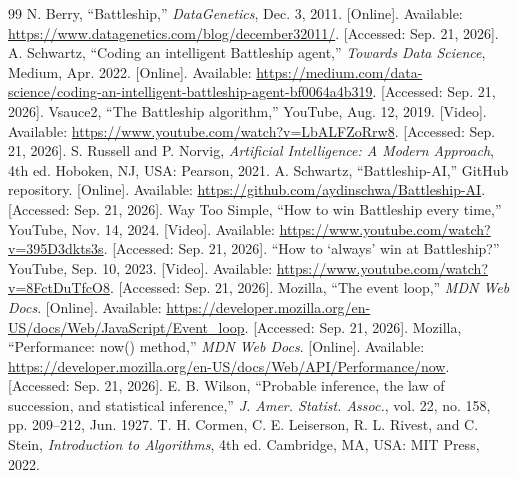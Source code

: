 \documentclass[letterpaper,11pt]{article} %
\begin{document}
\begin{thebibliography}{99}
     N. Berry, ``Battleship,'' \textit{DataGenetics}, Dec. 3, 2011. [Online]. Available: \url{https://www.datagenetics.com/blog/december32011/}. [Accessed: Sep. 21, 2026].
     A. Schwartz, ``Coding an intelligent Battleship agent,'' \textit{Towards Data Science}, Medium, Apr. 2022. [Online]. Available: \url{https://medium.com/data-science/coding-an-intelligent-battleship-agent-bf0064a4b319}. [Accessed: Sep. 21, 2026].
     Vsauce2, ``The Battleship algorithm,'' YouTube, Aug. 12, 2019. [Video]. Available: \url{https://www.youtube.com/watch?v=LbALFZoRrw8}. [Accessed: Sep. 21, 2026].
     S. Russell and P. Norvig, \textit{Artificial Intelligence: A Modern Approach}, 4th ed. Hoboken, NJ, USA: Pearson, 2021.
     A. Schwartz, ``Battleship-AI,'' GitHub repository. [Online]. Available: \url{https://github.com/aydinschwa/Battleship-AI}. [Accessed: Sep. 21, 2026].
     Way Too Simple, ``How to win Battleship every time,'' YouTube, Nov. 14, 2024. [Video]. Available: \url{https://www.youtube.com/watch?v=395D3dkts3s}. [Accessed: Sep. 21, 2026].
     ``How to `always' win at Battleship?'' YouTube, Sep. 10, 2023. [Video]. Available: \url{https://www.youtube.com/watch?v=8FctDuTfcO8}. [Accessed: Sep. 21, 2026].
     Mozilla, ``The event loop,'' \textit{MDN Web Docs}. [Online]. Available: \url{https://developer.mozilla.org/en-US/docs/Web/JavaScript/Event_loop}. [Accessed: Sep. 21, 2026].
     Mozilla, ``Performance: now() method,'' \textit{MDN Web Docs}. [Online]. Available: \url{https://developer.mozilla.org/en-US/docs/Web/API/Performance/now}. [Accessed: Sep. 21, 2026].
     E. B. Wilson, ``Probable inference, the law of succession, and statistical inference,'' \textit{J. Amer. Statist. Assoc.}, vol. 22, no. 158, pp. 209--212, Jun. 1927.
     T. H. Cormen, C. E. Leiserson, R. L. Rivest, and C. Stein, \textit{Introduction to Algorithms}, 4th ed. Cambridge, MA, USA: MIT Press, 2022.
\end{thebibliography}
\end{document}

